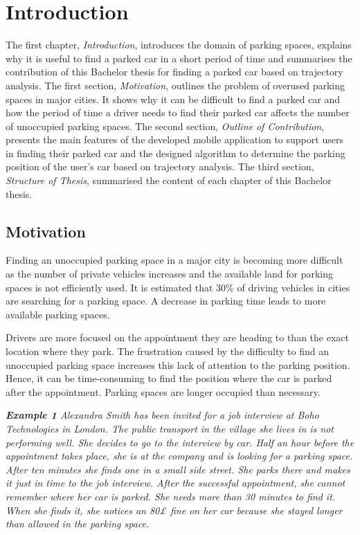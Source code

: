 \chapter{Introduction}

The first chapter, \textit{Introduction}, introduces the domain of parking spaces, explains why it is useful to find a parked car in a short period of time and summarises the contribution of this Bachelor thesis for finding a parked car based on trajectory analysis.
The first section, \textit{Motivation}, outlines the problem of overused parking spaces in major cities. It shows why it can be difficult to find a parked car and how the period of time a driver needs to find their parked car affects the number of unoccupied parking spaces.
The second section, \textit{Outline of Contribution}, presents the main features of the developed mobile application to support users in finding their parked car and the designed algorithm to determine the parking position of the user's car based on trajectory analysis. 
The third section, \textit{Structure of Thesis}, summarised the content of each chapter of this Bachelor thesis.


\section{Motivation}
Finding an unoccupied parking space in a major city is becoming more difficult as the number of private vehicles increases and the available land for parking spaces is not efficiently used. It is estimated that 30\% of driving vehicles in cities are searching for a parking space. A decrease in parking time leads to more available parking spaces. \cite{wu2007robust}\cite{Ibrahim2018}\cite{Geng2012}

Drivers are more focused on the appointment they are heading to than the exact location where they park. The frustration caused by the difficulty to find an unoccupied parking space increases this lack of attention to the parking position. Hence, it can be time-consuming to find the position where the car is parked after the appointment. Parking spaces are longer occupied than necessary.
  
\textit{\textbf{Example 1}
Alexandra Smith has been invited for a job interview at Boho Technologies in London. The public transport in the village she lives in is not performing well. She decides to go to the interview by car. Half an hour before the appointment takes place, she is at the company and is looking for a parking space. After ten minutes she finds one in a small side street. She parks there and makes it just in time to the job interview. After the successful appointment, she cannot remember where her car is parked. She needs more than 30 minutes to find it. When she finds it, she notices an 80£ fine on her car because she stayed longer than allowed in the parking space.
}

